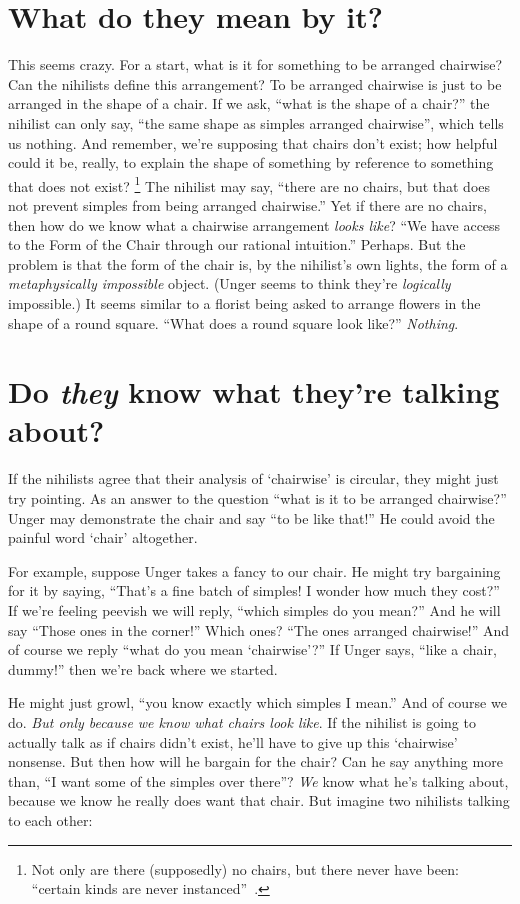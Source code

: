 \section{What do they mean by it?}
This seems crazy. For a start, what is it for something to be arranged chairwise? Can the nihilists define this arrangement? To be arranged chairwise is just to be arranged in the shape of a chair. If we ask, ``what is the shape of a chair?'' the nihilist can only say, ``the same shape as simples arranged chairwise'', which tells us nothing. And remember, we're supposing that chairs don't exist; how helpful could it be, really, to explain the shape of something by reference to something that does not exist?%
%
\footnote{Not only are there (supposedly) no chairs, but there never have been: ``certain kinds are never instanced''~\citep[147]{unger1979}.}%
The nihilist may say, ``there are no chairs, but that does not prevent simples from being arranged chairwise.'' Yet if there are no chairs, then how do we know what a chairwise arrangement {\em looks like}? ``We have access to the Form of the Chair through our rational intuition.'' Perhaps. But the problem is that the form of the chair is, by the nihilist's own lights, the form of a {\em metaphysically impossible} object. (Unger seems to think they're {\em logically} impossible.) It seems similar to a florist being asked to arrange flowers in the shape of a round square. ``What does a round square look like?'' {\em Nothing}.

\section{Do {\em they} know what they're talking about?}
If the nihilists agree that their analysis of `chairwise' is circular, they might just try pointing. As an answer to the question ``what is it to be arranged chairwise?'' Unger may demonstrate the chair and say ``to be like that!'' He could avoid the painful word `chair' altogether.

For example, suppose Unger takes a fancy to our chair. He might try bargaining for it by saying, ``That's a fine batch of simples! I wonder how much they cost?'' If we're feeling peevish we will reply, ``which simples do you mean?'' And he will say ``Those ones in the corner!'' Which ones? ``The ones arranged chairwise!'' And of course we reply ``what do you mean `chairwise'?'' If Unger says, ``like a chair, dummy!'' then we're back where we started.

He might just growl, ``you know exactly which simples I mean.'' And of course we do. {\em But only because we know what chairs look like}. If the nihilist is going to actually talk as if chairs didn't exist, he'll have to give up this `chairwise' nonsense. But then how will he bargain for the chair? Can he say anything more than, ``I want some of the simples over there''? {\em We} know what he's talking about, because we know he really does want that chair. But imagine two nihilists talking to each other:

